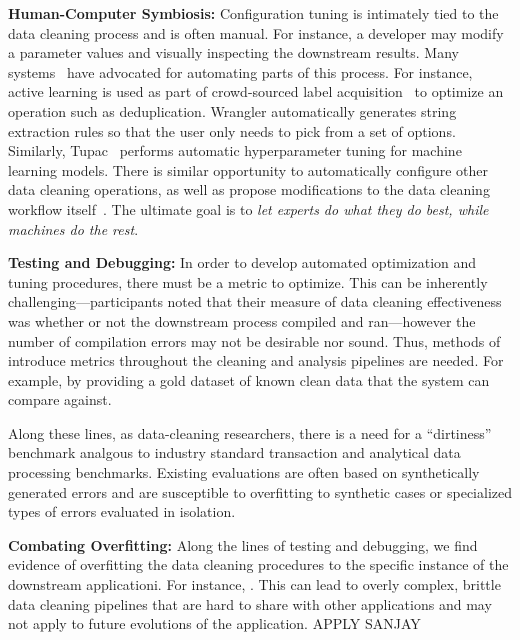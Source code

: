 \noindent\textbf{Human-Computer Symbiosis:}  Configuration tuning is intimately tied to the data cleaning process and is often manual.  For instance, a developer may modify a parameter values and visually inspecting the downstream results.  Many systems~\cite{} have advocated for automating parts of this process.  For instance, active learning is used as part of crowd-sourced label acquisition~\cite{} to optimize an operation such as deduplication.  Wrangler automatically generates string extraction rules so that the user only needs to pick from a set of options.  Similarly, Tupac~\cite{tupac} performs automatic hyperparameter tuning for machine learning models.   There is similar opportunity to automatically configure other data cleaning operations, as well as propose modifications to the data cleaning workflow itself~\cite{wisteria}.  The ultimate goal is to {\it let experts do what they do best, while machines do the rest}.


\noindent\textbf{Testing and Debugging:} In order to develop automated optimization and tuning procedures, there must be a metric to optimize.  This can be inherently challenging---participants noted that their measure of data cleaning effectiveness was whether or not the downstream process compiled and ran---however the number of compilation errors may not be desirable nor sound.  Thus, methods of introduce metrics throughout the cleaning and analysis pipelines are needed.  For example, by providing a gold dataset of known clean data that the system can compare against.  

Along these lines, as data-cleaning researchers, there is a need for a ``dirtiness'' benchmark analgous to industry standard transaction and analytical data processing benchmarks.  Existing evaluations are often based on synthetically generated errors and are susceptible to overfitting to synthetic cases or specialized types of errors evaluated in isolation.  


\noindent\textbf{Combating Overfitting:} Along the lines of testing and debugging, we find evidence of overfitting the data cleaning procedures to the specific instance of the downstream applicationi.  For instance, {\color{red}{EXAMPLE}}.  This can lead to overly complex, brittle data cleaning pipelines that are hard to share with other applications and may not apply to future evolutions of the application.  APPLY SANJAY

